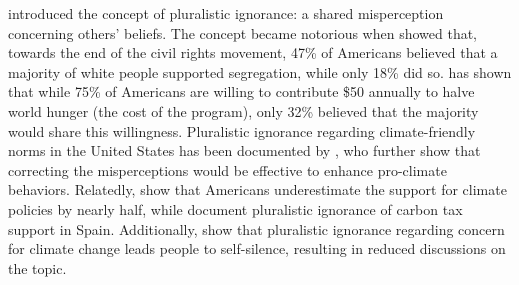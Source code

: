  introduced the concept of pluralistic ignorance: a shared misperception concerning others' beliefs. The concept became notorious when  showed that, towards the end of the civil rights movement, 47\% of Americans believed that a majority of white people supported segregation, while only 18\% did so. %
 has shown that while 75\% of Americans are willing to contribute \$50 annually to halve world hunger (the cost of the program), only 32\% believed that the majority would share this willingness. 
Pluralistic ignorance regarding climate-friendly norms in the United States has been documented by , who further show that correcting the misperceptions would be effective to enhance pro-climate behaviors. Relatedly,  show that Americans underestimate the support for climate policies by nearly half, while  document pluralistic ignorance of carbon tax support in Spain. 
Additionally,  show that pluralistic ignorance regarding concern for climate change leads people to self-silence, resulting in reduced discussions on the topic.

